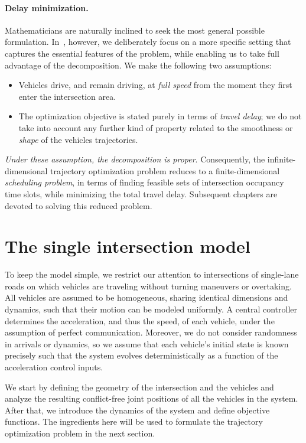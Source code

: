 \documentclass[a4paper]{report}
\theoremstyle{definition}
\theoremstyle{plain}
\begin{document}
\paragraph{Delay minimization.}

Mathematicians are naturally inclined to seek the most general possible
formulation. In~, however, we deliberately focus on
a more specific setting that captures the essential features of the problem,
while enabling us to take full advantage of the decomposition.
%
We make the following two assumptions:
\begin{itemize}
  \item Vehicles drive, and remain driving, at \emph{full speed} from the
        moment they first enter the intersection area.
  \item The optimization objective is stated purely in terms of \emph{travel delay};
        we do not take into account any further kind of property related to the
        smoothness or \emph{shape} of the vehicles trajectories.
\end{itemize}
%
\emph{Under these assumption, the decomposition is proper}. Consequently, the
infinite-dimensional trajectory optimization problem reduces to a
finite-dimensional \emph{scheduling problem}, in terms of finding feasible sets
of intersection occupancy time slots, while minimizing the total travel delay.
%
Subsequent chapters are devoted to solving this reduced problem.

\section{The single intersection model}\label{sec:intersection-model}

To keep the model simple, we restrict our attention to intersections of
single-lane roads on which vehicles are traveling without turning maneuvers or
overtaking.
%
All vehicles are assumed to be homogeneous, sharing identical dimensions and
dynamics, such that their motion can be modeled uniformly.
%
A central controller determines the acceleration, and thus the speed, of each
vehicle, under the assumption of perfect communication.
%
Moreover, we do not consider randomness in arrivals or dynamics, so we assume
that each vehicle's initial state is known precisely such that the system
evolves deterministically as a function of the acceleration control inputs.

We start by defining the geometry of the intersection and the vehicles and
analyze the resulting conflict-free joint positions of all the vehicles in the
system.
%
After that, we introduce the dynamics of the system and define objective
functions.
%
The ingredients here will be used to formulate the trajectory optimization
problem in the next section.
\end{document}
